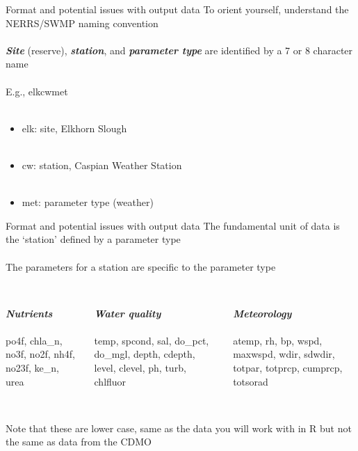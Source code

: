 \documentclass[xcolor=svgnames]{beamer}\usepackage[]{graphicx}\usepackage[]{color}
\newcommand{\Bigtxt}[1]{\textbf{\textit{#1}}}
\begin{document}
\begin{frame}{Format and potential issues with output data}
\onslide<+->
To orient yourself, understand the NERRS/SWMP naming convention\\~\\
\Bigtxt{Site} (reserve), \Bigtxt{station}, and \Bigtxt{parameter type} are identified by a 7 or 8 character name \\~\\
\onslide<+->
E.g., elkcwmet \\~\\
\onslide<+->
\begin{itemize}
\item elk: site, Elkhorn Slough \\~\\
\item cw: station, Caspian Weather Station \\~\\
\item met: parameter type (weather)
\end{itemize}
\end{frame}

\begin{frame}{Format and potential issues with output data}
\onslide<+->
The fundamental unit of data is the `station' defined by a parameter type \\~\\
The parameters for a station are specific to the parameter type \\~\\
\onslide<+->
\begin{columns}[t]
\begin{column}{0.3\textwidth}
\Bigtxt{Nutrients} \\~\\
po4f, chla\_n, no3f, no2f, nh4f, no23f, ke\_n, urea
\end{column}
\begin{column}{0.3\textwidth}
\Bigtxt{Water quality} \\~\\
temp, spcond, sal, do\_pct, do\_mgl, depth, cdepth, level, clevel, ph, turb, chlfluor
\end{column}
\begin{column}{0.3\textwidth}
\Bigtxt{Meteorology} \\~\\
atemp, rh, bp, wspd, maxwspd, wdir, sdwdir, totpar, totprcp, cumprcp, totsorad \\~\\
\end{column}
\end{columns}
\onslide<+->
Note that these are lower case, same as the data you will work with in R but not the same as data from the CDMO
\end{frame}
\end{document}
